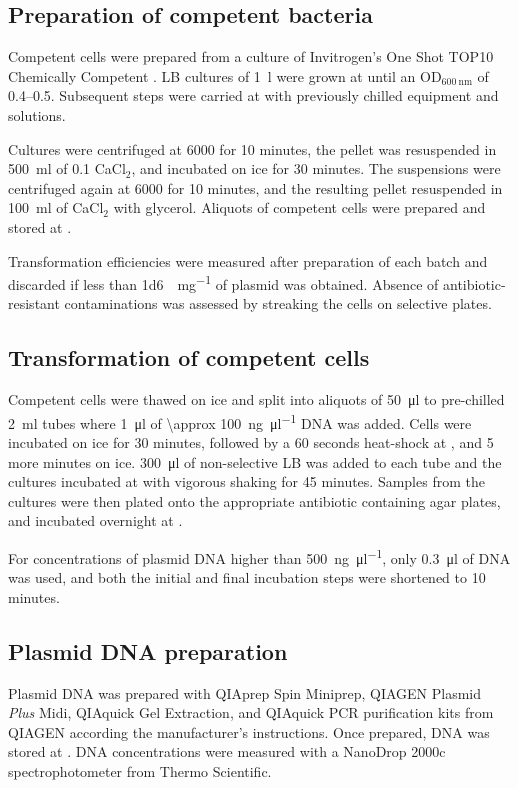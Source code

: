     \subsection{Preparation of competent bacteria}
      Competent  cells were prepared from a culture of
      Invitrogen's One Shot TOP10 Chemically Competent . LB
      cultures of \SI{1}{\l} were grown at  until an OD$_{\SI{600}{\nm}}$
      of \numrange{0.4}{0.5}.  Subsequent steps were carried at  with
      previously chilled equipment and solutions.

      Cultures were centrifuged at \SI{6000}{\gn} for 10 minutes, the
      pellet was resuspended in \SI{500}{\ml} of \SI{0.1}{\mM} CaCl$_2$, and
      incubated on ice for 30 minutes. The suspensions were centrifuged
      again at \SI{6000}{\gn} for 10 minutes,
      and the resulting pellet resuspended in
      \SI{100}{\ml} of CaCl$_2$ with  glycerol. Aliquots of
      competent cells were prepared and stored at .

      Transformation efficiencies were measured after preparation of each
      batch and discarded if less than \SI{1d6}{\cfu\per\mg} of plasmid was
      obtained. Absence of antibiotic-resistant contaminations was assessed
      by streaking the cells on selective plates.

    \subsection{Transformation of competent cells}
      Competent cells were thawed on ice and split into aliquots of
      \SI{50}{\ul} to pre-chilled \SI{2}{\ml} tubes where
      \SI{1}{\ul} of \SI{\approx 100}{\ng\per\ul} DNA
      was added. Cells were incubated on ice for 30 minutes, followed by a
      60 seconds heat-shock at , and 5 more minutes on ice.
      \SI{300}{\ul} of non-selective LB was added to each tube and the
      cultures incubated at  with vigorous shaking for 45 minutes.
      Samples from the cultures were then plated onto the appropriate
      antibiotic containing agar plates, and incubated overnight at .

      For concentrations of plasmid DNA higher than \SI{500}{\ng\per\ul}, only
      \SI{0.3}{\ul} of DNA was used, and both the initial and final incubation
      steps were shortened to 10 minutes.

    \subsection{Plasmid DNA preparation}
      Plasmid DNA was prepared with QIAprep Spin Miniprep,
      QIAGEN Plasmid \textit{Plus} Midi, QIAquick Gel Extraction, and QIAquick
      PCR purification kits from QIAGEN
      according the manufacturer's instructions.
      Once prepared, DNA was stored at .
      DNA concentrations were measured
      with a NanoDrop 2000c spectrophotometer from
      Thermo Scientific.

